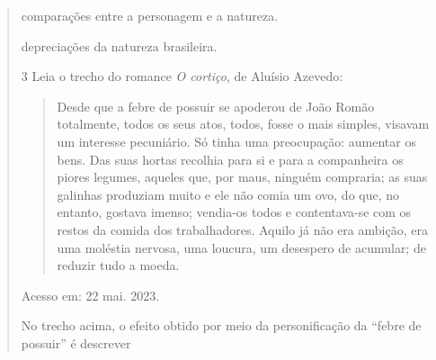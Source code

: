 {\begin{quote}
{\begin{escolha}
  \item comparações entre a personagem e a natureza.

  \item depreciações da natureza brasileira.

\end{escolha}


\num{3} Leia o trecho do romance \textit{O cortiço}, de Aluísio Azevedo:



\begin{quote}

Desde que a febre de possuir se apoderou de João Romão totalmente, todos os seus atos, todos, 
fosse o mais simples, visavam um interesse pecuniário. Só tinha uma preocupação: aumentar 
os bens. Das suas hortas recolhia para si e para a companheira os piores legumes, aqueles que,
por maus, ninguém compraria; as suas galinhas produziam muito e ele não comia um ovo, do que, 
no entanto, gostava imenso; vendia-os todos e contentava-se com os restos da comida dos 
trabalhadores. Aquilo já não era ambição, era uma moléstia nervosa, uma loucura, um desespero
de acumular; de reduzir tudo a moeda.

\end{quote}

Acesso em: 22 mai. 2023.}

No trecho acima, o efeito obtido por meio da personificação da ``febre de possuir'' é descrever


\end{quote}}
